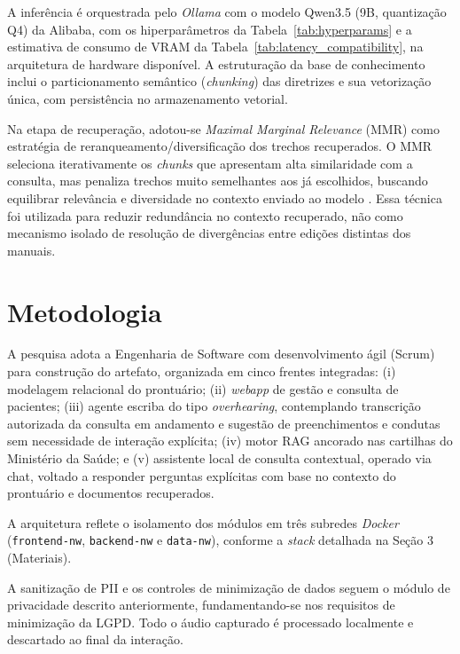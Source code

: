 \documentclass[12pt]{article}
\begin{document}
A inferência é orquestrada pelo \textit{Ollama} com o modelo Qwen3.5 (9B, quantização Q4) da Alibaba, com os hiperparâmetros da Tabela~\ref{tab:hyperparams} e a estimativa de consumo de VRAM da Tabela~\ref{tab:latency_compatibility}, na arquitetura de hardware disponível.
A estruturação da base de conhecimento inclui o particionamento semântico (\textit{chunking}) das diretrizes e sua vetorização única, com persistência no armazenamento vetorial.

Na etapa de recuperação, adotou-se \textit{Maximal Marginal Relevance} (MMR) como estratégia de reranqueamento/diversificação dos trechos recuperados.
O MMR seleciona iterativamente os \textit{chunks} que apresentam alta similaridade com a consulta, mas penaliza trechos muito semelhantes aos já escolhidos, buscando equilibrar relevância e diversidade no contexto enviado ao modelo \cite{CarbonellGoldstein1998MMR}.
Essa técnica foi utilizada para reduzir redundância no contexto recuperado, não como mecanismo isolado de resolução de divergências entre edições distintas dos manuais.


\section{Metodologia}\label{sec:metodo}

A pesquisa adota a Engenharia de Software com desenvolvimento ágil (Scrum) para construção do artefato, organizada em cinco frentes integradas:
(i) modelagem relacional do prontuário;
(ii) \textit{webapp} de gestão e consulta de pacientes;
(iii) agente escriba do tipo \textit{overhearing}, contemplando transcrição autorizada da consulta em andamento e sugestão de preenchimentos e condutas sem necessidade de interação explícita;
(iv) motor RAG ancorado nas cartilhas do Ministério da Saúde;
e (v) assistente local de consulta contextual, operado via chat, voltado a responder perguntas explícitas com base no contexto do prontuário e documentos recuperados.

A arquitetura reflete o isolamento dos módulos em três subredes \textit{Docker} (\texttt{frontend-nw}, \texttt{backend-nw} e \texttt{data-nw}), conforme a \textit{stack} detalhada na Seção 3 (Materiais). 

A sanitização de PII e os controles de minimização de dados seguem o módulo de privacidade descrito anteriormente, fundamentando-se nos requisitos de minimização da LGPD.
Todo o áudio capturado é processado localmente e descartado ao final da interação.
\end{document}
